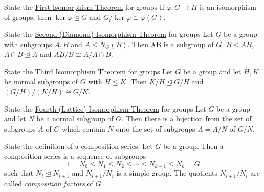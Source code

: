 \documentclass[avery5371,grid]{flashcards}
\let \phi \varphi
\begin{document}
\begin{flashcard}[Groups]{State the \underline{First Isomorphism Theorem} for groups}
 If $\phi: G \to H$ is an isomorphism of groups, then $\ker \phi \trianglelefteq G$ and $G/\ker \phi \cong \phi(G)$.
\end{flashcard}

\begin{flashcard}[Groups]{State the \underline{Second (Diamond) Isomorphism Theorem} for groups}
 Let $G$ be a group with subgroups $A,B$ and $A \leq N_G(B)$. Then AB is a subgroup of $G$, $B \trianglelefteq AB$, $A \cap B \trianglelefteq A$ and $AB/B \cong A/A \cap B$.
 \begin{center}
 \end{center}

\end{flashcard}


\begin{flashcard}[Groups]{State the \underline{Third Isomorphism Theorem} for groups}
 Let $G$ be a group and let $H,K$ be normal subgroups of $G$ with $H \leq K$. Then $K/H \trianglelefteq G/H$ and $(G/H)/(K/H) \cong G/K$.
\end{flashcard}

\begin{flashcard}[Groups]{State the \underline{Fourth (Lattice) Isomorphism Theorem} for groups}
 Let $G$ be a group and let $N$ be a normal subgroup of $G$. Then there is a bijection from the set of subgroups $A$ of $G$ which contain $N$ onto the set of subgroups $\overline{A} = A/N$ of $G/N$.
\end{flashcard}

\begin{flashcard}[Groups]{State the definition of a \underline{composition series}.}
 Let $G$ be a group. Then a composition series is a sequence of subgroups
 $$
 1 = N_0 \leq N_1 \leq N_2 \leq \cdots \leq N_{k-1} \leq N_k = G
 $$
 such that $N_i \trianglelefteq N_{i+1}$ and $N_{i+1}/N_i$ is a simple group. The quotients $N_{i+1}/N_i$ are called \emph{composition factors} of $G$.
\end{flashcard}
\end{document}
